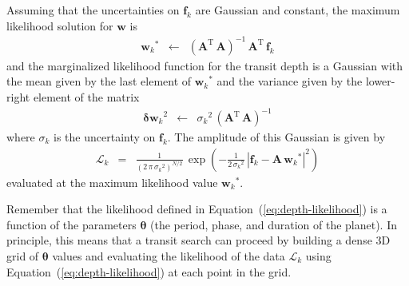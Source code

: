 \documentclass[12pt,preprint]{aastex}
\newcommand{\Eq}[1]{Equation~(\ref{eq:#1})}
\newcommand{\eq}[1]{\Eq{#1}}
\newcommand{\eqlabel}[1]{\label{eq:#1}}
\newcommand{\T}{\ensuremath{\mathrm{T}}}
\newcommand{\bvec}[1]{{\ensuremath{\boldsymbol{#1}}}}
\begin{document}
Assuming that the uncertainties on $\bvec{f}_k$ are Gaussian and constant,
the maximum likelihood solution for \bvec{w} is
\begin{eqnarray}
{\bvec{w}_k}^* &\gets& \left( \bvec{A}^\T\,\bvec{A} \right)^{-1}\,
                       \bvec{A}^\T\,\bvec{f}_k
\end{eqnarray}
and the marginalized likelihood function for the transit depth is a Gaussian
with the mean given by the last element of ${\bvec{w}_k}^*$ and the variance
given by the lower-right element of the matrix
\begin{eqnarray}
{\bvec{\delta w}_k}^2 &\gets& {\sigma_k}^2 \,
            \left( \bvec{A}^\T\,\bvec{A} \right)^{-1}
\end{eqnarray}
where $\sigma_k$ is the uncertainty on $\bvec{f}_k$.
The amplitude of this Gaussian is given by
\begin{eqnarray}\eqlabel{depth-likelihood}
\mathcal{L}_k &=& \frac{1}{(2\,\pi\,{\sigma_k}^2)^{N/2}}\,\exp\left(
-\frac{1}{2\,{\sigma_k}^2}\,
\left| \bvec{f}_k - \bvec{A}\,{\bvec{w}_k}^* \right|^2
\right)
\end{eqnarray}
evaluated at the maximum likelihood value ${\bvec{w}_k}^*$.

Remember that the likelihood defined in \eq{depth-likelihood} is a function of
the parameters \bvec{\theta} (the period, phase, and duration of the planet).
In principle, this means that a transit search can proceed by building a dense
3D grid of \bvec{\theta} values and evaluating the likelihood of the data
$\mathcal{L}_k$ using \eq{depth-likelihood} at each point in the grid.

\clearpage
\end{document}
